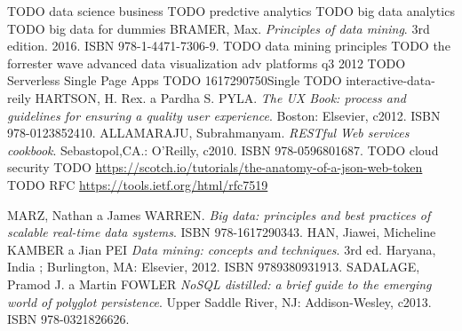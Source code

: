 \begin{thebibliography}{99}
TODO data science business
TODO predctive analytics
TODO big data analytics
TODO big data for dummies
BRAMER, Max.
\textit{Principles of data mining}.
3rd edition. 2016. ISBN 978-1-4471-7306-9.
TODO data mining principles
TODO the forrester wave advanced data visualization adv platforms q3 2012
TODO Serverless Single Page Apps
TODO 1617290750Single
TODO interactive-data-reily
HARTSON, H. Rex. a Pardha S. PYLA.
\textit{The UX Book: process and guidelines for ensuring a quality user experience}.
Boston: Elsevier, c2012. ISBN 978-0123852410.
ALLAMARAJU, Subrahmanyam.
\textit{RESTful Web services cookbook}.
Sebastopol,CA.: O'Reilly, c2010. ISBN 978-0596801687.
TODO cloud security
TODO \url{https://scotch.io/tutorials/the-anatomy-of-a-json-web-token}
TODO RFC \url{https://tools.ietf.org/html/rfc7519}

MARZ, Nathan a James WARREN.
\textit{Big data: principles and best practices of scalable real-time data systems}.
ISBN 978-1617290343.
HAN, Jiawei, Micheline KAMBER a Jian PEI
\textit{Data mining: concepts and techniques}.
3rd ed. Haryana, India ; Burlington, MA: Elsevier, 2012. ISBN 9789380931913.
SADALAGE, Pramod J. a Martin FOWLER
\textit{NoSQL distilled: a brief guide to the emerging world of polyglot persistence}.
Upper Saddle River, NJ: Addison-Wesley, c2013. ISBN 978-0321826626.

\end{thebibliography}
